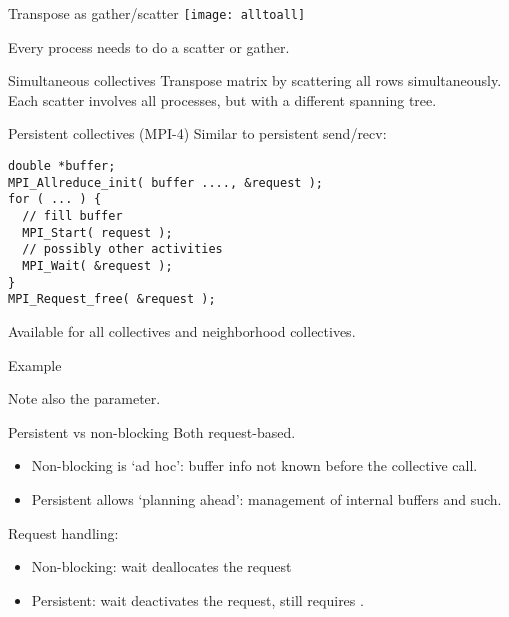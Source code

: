 \begin{numberedframe}{Transpose as gather/scatter}
  \texttt{[image: alltoall]}

  Every process needs to do a scatter or gather.
\end{numberedframe}

\begin{numberedframe}{Simultaneous collectives}
  Transpose matrix by scattering all rows simultaneously.\\
  Each scatter involves all processes, but with a
  different spanning tree.

\end{numberedframe}


\begin{numberedframe}{Persistent collectives (MPI-4)}
  Similar to persistent send/recv:
\begin{lstlisting}
double *buffer;
MPI_Allreduce_init( buffer ...., &request );
for ( ... ) {
  // fill buffer
  MPI_Start( request );
  // possibly other activities
  MPI_Wait( &request );
}
MPI_Request_free( &request );
\end{lstlisting}
Available for all collectives and neighborhood collectives.
\end{numberedframe}

\begin{numberedframe}{Example}

  Note also the  parameter.
\end{numberedframe}

\begin{numberedframe}{Persistent vs non-blocking}
  Both request-based.
  \begin{itemize}
  \item Non-blocking is `ad hoc': buffer info not known before the collective call.
  \item Persistent allows `planning ahead': management of internal buffers and such.
  \end{itemize}
  Request handling:
  \begin{itemize}
  \item Non-blocking: wait deallocates the request
  \item Persistent: wait deactivates the request,
    still requires .
  \end{itemize}
\end{numberedframe}

